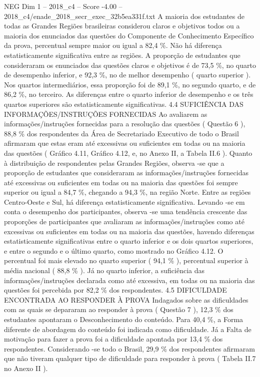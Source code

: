 \begin{textsample}{NEG Dim 1 – 2018\_c4 – Score -4.00 – 2018\_c4/enade\_2018\_secr\_exec\_32b5ea331f.txt}
A maioria dos estudantes de todas as Grandes Regiões brasileiras considerou claros e objetivos todos ou a maioria dos enunciados das questões do Componente de Conhecimento Específico da prova, percentual sempre maior ou igual a 82,4 \%.
Não há diferença estatisticamente significativa entre as regiões.
A proporção de estudantes que consideraram os enunciados das questões claros e objetivos é de 73,5 \%, no quarto de desempenho inferior, e 92,3 \%, no de melhor desempenho ( quarto superior ).
Nos quartos intermediários, essa proporção foi de 89,1 \%, no segundo quarto, e de 86,2 \%, no terceiro.
As diferenças entre o quarto inferior de desempenho e os três quartos superiores são estatisticamente significativas. 4.4 SUFICIÊNCIA DAS INFORMAÇÕES/INSTRUÇÕES FORNECIDAS Ao avaliarem as informações/instruções fornecidas para a resolução das questões ( Questão 6 ), 88,8 \% dos respondentes da Área de Secretariado Executivo de todo o Brasil afirmaram que estas eram até excessivas ou suficientes em todas ou na maioria das questões ( Gráfico 4.11, Gráfico 4.12, e, no Anexo II, a Tabela II.6 ).
Quanto à distribuição de respondentes pelas Grandes Regiões, observa -se que a proporção de estudantes que consideraram as informações/instruções fornecidas até excessivas ou suficientes em todas ou na maioria das questões foi sempre superior ou igual a 84,7 \%, chegando a 94,3 \%, na região Norte.
Entre as regiões Centro-Oeste e Sul, há diferença estatisticamente significativa.
Levando -se em conta o desempenho dos participantes, observa -se uma tendência crescente das proporções de participantes que avaliaram as informações/instruções como até excessivas ou suficientes em todas ou na maioria das questões, havendo diferenças estatisticamente significativas entre o quarto inferior e os dois quartos superiores, e entre o segundo e o último quarto, como mostrado no Gráfico 4.12.
O percentual foi mais elevado no quarto superior ( 94,1 \% ), percentual superior à média nacional ( 88,8 \% ).
Já no quarto inferior, a suficiência das informações/instruções declarada como até excessiva, em todas ou na maioria das questões foi percebida por 82,2 \% dos respondentes. 4.5 DIFICULDADE ENCONTRADA AO RESPONDER À PROVA Indagados sobre as dificuldades com as quais se depararam ao responder à prova ( Questão 7 ), 12,3 \% dos estudantes apontaram o Desconhecimento do conteúdo.
Para 40,4 \%, a Forma diferente de abordagem do conteúdo foi indicada como dificuldade.
Já a Falta de motivação para fazer a prova foi a dificuldade apontada por 13,4 \% dos respondentes.
Considerando -se todo o Brasil, 29,9 \% dos respondentes afirmaram que não tiveram qualquer tipo de dificuldade para responder à prova ( Tabela II.7 no Anexo II ).

\end{textsample}
